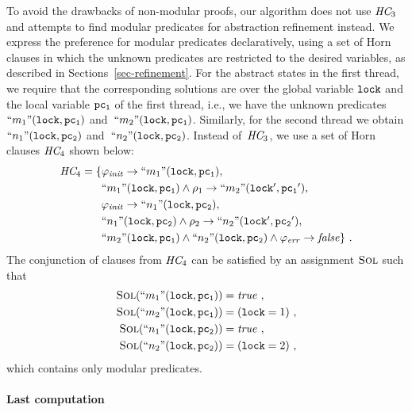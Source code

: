To avoid the drawbacks of non-modular proofs, our algorithm does not
use $\textit{HC}_3$ and attempts to find modular predicates for
abstraction refinement instead.
We express the preference for modular predicates declaratively, using
a set of Horn clauses in which the unknown predicates are restricted
to the desired variables, as described in
Sections~\ref{sec-refinement}.
For the abstract states in the first thread, we require that the
corresponding solutions are over the global variable $\mathtt{lock}$ and the
local variable $\mathtt{pc_1}$ of the first thread, i.e., we have the unknown
predicates $\text{``}m_1\text{''}(\mathtt{lock}, \mathtt{pc_1})$ and~$\text{``}m_2\text{''} (\mathtt{lock},
\mathtt{pc_1})$.
Similarly, for the second thread we obtain $\text{``}n_1\text{''}(\mathtt{lock},
\mathtt{pc_2})$ and~$\text{``}n_2\text{''}(\mathtt{lock}, \mathtt{pc_2})$.
Instead of~$\textit{HC}_3$,  we use a set of Horn clauses $\textit{HC}_4$ shown below:
%
\begin{equation*}
  \HornClauses_4 = \set{
    \begin{array}[t]{@{}l@{}}
       \SymbInit \limplies \unkOf{m_1}(\lock, 
       \pcone),\\[\jot]
       \unkOf{m_1}(\lock, \pcone) \land \rel_1 \limplies \unkOf{m_2}(\lock', \pcone'),\\[\jot]
       \SymbInit \limplies \unkOf{n_1}(\lock, \pctwo),\\[\jot]
       \unkOf{n_1}(\lock, \pctwo) \land \rel_2 \limplies \unkOf{n_2}(\lock', \pctwo'),\\[\jot]
       \unkOf{m_2}(\lock, \pcone) \land \unkOf{n_2}(\lock, \pctwo) \land \SymbError \limplies 
       \lfalse }\ .
  \end{array}
\end{equation*}
%
The conjunction of clauses from $\textit{HC}_4$ can be satisfied by
an assignment $\textsc{Sol}$ such that
%
\begin{equation*}
  \begin{array}[t]{r@{\;=\;}l}
    \SolutionOf{\unkOf{m_1}(\lock, \pcone)} &\ltrue\ , \\[\jot]
    \SolutionOf{\unkOf{m_2}(\lock, \pcone)} &(\lock=1)\ , \\[\jot]
    \SolutionOf{\unkOf{n_1}(\lock, \pctwo)} &\ltrue\ ,\\[\jot]
    \SolutionOf{\unkOf{n_2}(\lock, \pctwo)} &(\lock=2)\ ,
  \end{array}
\end{equation*}
%
which contains only modular predicates.

 

\paragraph{Last \aret computation} 

